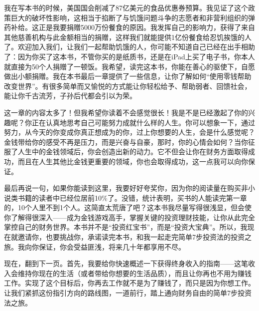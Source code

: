 我在写本书的时候，美国国会削减了87亿美元的食品优惠券预算。我见证了这个政策巨大的破坏性影响，这相当于掐断了与饥饿问题斗争的志愿者和非营利组织的弹药补给。这正是我要捐赠5000万份餐食的原因。我发挥自己的影响力，获得了来自其他慈善机构与此金额相当的捐赠，这样我们就能提供1亿份餐食给忍饥挨饿的人了。欢迎加入我们，让我们一起帮助饥饿的人，你可能不知道自己已经在出手相助了：因为你买了这本书，不管你买的是纸质书，还是在iPad上买了电子书，你本人就直接为50个人捐赠了一顿饭。我希望，读完这本书，你能在善心的驱使下，自愿做出小额捐赠。我在本书最后一章提供了一些信息，让你了解如何“使用零钱帮助改变世界”。有很多简单而又愉悦的方式能让你轻松给予、帮助弱者、回馈社会，能让你千古流芳，子孙后代都会引以为荣。

这一章的内容太多了！但我希望你读着不会感觉很长！我是不是已经激起了你的兴趣呢？你正在认真地思考自己可能努力成就什么样的人生。你可以想象一下，通过努力，从今天的你变成你真正想成为的你，过上你想要的人生，会是什么感觉呢？金钱带给你的感受不再是压力，而是兴奋与自豪，那时，你的心情会如何？当你征服了人生中的金钱领域后，你会创造出新的动力。它不但会让你在财务方面取得成功，而且在人生其他比金钱更重要的领域，你也会取得成功，这一点我可以向你保证。

最后再说一句，如果你能读到这里，我要好好夸奖你，因为你的阅读量在购买非小说类书籍的读者中已经位居前10\%了。没错，统计表明，买书的人能读完第一章的，10个人里不到1个人。这简直太荒唐了吧？这本书我尽量写得很浅显，但会使你了解得很深入——成为金钱游戏高手，掌握关键的投资理财技能，让你从此完全掌控自己的财务世界。本书并不是“投资红宝书”，而是“投资大宝典”。所以，我现在就邀请你，也要挑战你，承诺读完本书，和我一起走完简单7步投资法的投资之旅。我向你保证，你会受益匪浅，将来几十年都享用不尽。

现在，翻到下一页。首先，我要给你快速概述一下获得终身收入的指南——这笔收入会维持你现在的生活（或者带给你想要的生活品质），而且让你再也不用为赚钱工作。实现了这个目标后，你再去工作就不是为了赚钱了，而只是因为你想工作。让我们紧抓这份指引方向的路线图，一道前行，踏上通向财务自由的简单7步投资法之旅。
